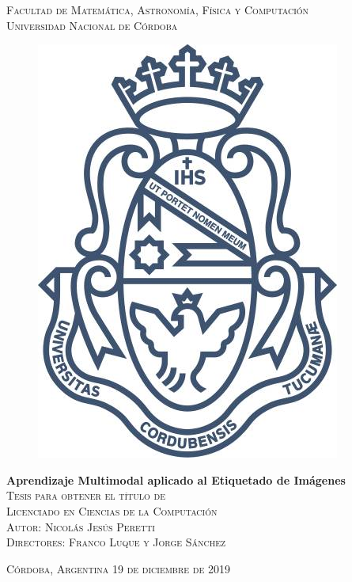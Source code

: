 \documentclass[12pt]{book}
\begin{document}
\begin{titlepage}
\begin{center}

\textsc{\Large{Facultad de Matemática, Astronomía, Física y Computación}}\\[1em]
\textsc{\large{Universidad Nacional de Córdoba}}\\[0.5em]

\begin{figure}[h]
\begin{center}
\includegraphics[width=.3\linewidth]{images/unc.jpg}
\end{center}
\end{figure}
\vspace{-0.1em}

\LARGE{\textbf{Aprendizaje Multimodal aplicado al Etiquetado de Imágenes}}\\[0.5em]

\textsc{\normalsize{Tesis para obtener el título de}}\\

\textsc{\large{Licenciado en Ciencias de la Computación}}\\

\textsc{\normalsize{Autor:} \Large{Nicolás Jesús Peretti}}\\

\textsc{\normalsize{Directores:} \large{Franco Luque y Jorge Sánchez}}

\end{center}

\vspace*{\fill}
\textsc{Córdoba, Argentina \hspace*{\fill} 19 de diciembre de 2019}

\end{titlepage}


\end{document}
